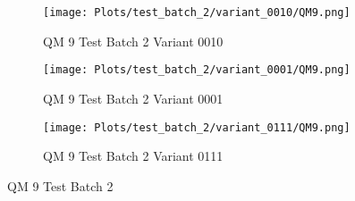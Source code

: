 \documentclass{DissertateFigs}
\begin{document}
\begin{figure}[t!]
\medskip

    \begin{subfigure}{0.47\textwidth}
    \texttt{[image: Plots/test\_batch\_2/variant\_0010/QM9.png]}
    \caption{QM 9 Test Batch 2 Variant 0010}
    \end{subfigure}
    \begin{subfigure}{0.47\textwidth}
    \texttt{[image: Plots/test\_batch\_2/variant\_0001/QM9.png]}
    \caption{QM 9 Test Batch 2 Variant 0001}
    \end{subfigure}

\medskip

    \begin{subfigure}{0.47\textwidth}
    \texttt{[image: Plots/test\_batch\_2/variant\_0111/QM9.png]}
    \caption{QM 9 Test Batch 2 Variant 0111}
    \end{subfigure}
\caption{QM 9 Test Batch 2}
    \end{figure}
\clearpage
\end{document}
